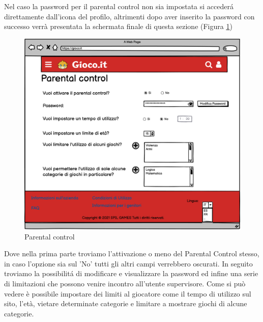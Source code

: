 \documentclass[../Report.tex]{subfiles}
\begin{document}
    Nel caso la password per il parental control non sia impostata si accederá direttamente dall'icona del profilo, altrimenti dopo aver inserito la password con successo verrà presentata la schermata finale di questa sezione (Figura \ref{fig: parental control})
        \begin{figure}[H]
            \centering
            \includegraphics[width=\textwidth]{WParentalControl.png}
            \caption{Parental control}
            \label{fig: parental control}
        \end{figure}
        Dove nella prima parte troviamo l'attivazione o meno del Parental Control stesso, in caso l'opzione sia sul 'No' tutti gli altri campi verrebbero oscurati.
        In seguito troviamo la possibilitá di modificare e visualizzare la password ed infine una serie di limitazioni che possono venire incontro all'utente supervisore.
        Come si può vedere è possibile impostare dei limiti al giocatore come il tempo di utilizzo sul sito, l'età, vietare determinate categorie e limitare a mostrare giochi di alcune categorie.\\
\end{document}
